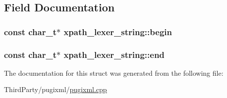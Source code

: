 \subsection{Field Documentation}
\hypertarget{structxpath__lexer__string_a0b985863d7363a75d4fdd0a7ece1fca0}{
\subsubsection[{begin}]{\setlength{\rightskip}{0pt plus 5cm}const char\-\_\-t$\ast$ xpath\-\_\-lexer\-\_\-string\-::begin}}\label{structxpath__lexer__string_a0b985863d7363a75d4fdd0a7ece1fca0}
\hypertarget{structxpath__lexer__string_a13bbedeca2f8c2fb1e294325eea66878}{
\subsubsection[{end}]{\setlength{\rightskip}{0pt plus 5cm}const char\-\_\-t$\ast$ xpath\-\_\-lexer\-\_\-string\-::end}}\label{structxpath__lexer__string_a13bbedeca2f8c2fb1e294325eea66878}


The documentation for this struct was generated from the following file\-:\begin{DoxyCompactItemize}
\item 
Third\-Party/pugixml/\hyperlink{pugixml_8cpp}{pugixml.\-cpp}\end{DoxyCompactItemize}
